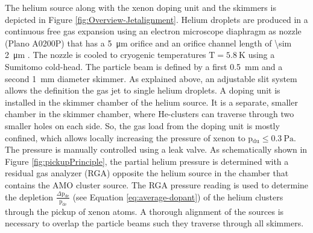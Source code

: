 The helium source along with the xenon doping unit and the skimmers is depicted in Figure \ref{fig:Overview-Jetalignment}. Helium droplets are produced in a continuous free gas expansion using an electron microscope diaphragm as nozzle (Plano A0200P) that has a \SI{5}{\micro\meter} orifice and an orifice channel length of \SI{\sim 2}{\micro\meter} \citep{Gomez-2011-JCP}. The nozzle is cooled to cryogenic temperatures $\text{T}= \SI{5.8}{\kelvin}$ using a Sumitomo cold-head. The particle beam is defined by a first \SI{0.5}{\milli\meter} and a second \SI{1}{\milli\meter} diameter skimmer. As explained above, an adjustable slit system allows the definition the gas jet to single helium droplets. A doping unit is installed in the skimmer chamber of the helium source. It is a separate, smaller chamber in the skimmer chamber, where He-clusters can traverse through two smaller holes on each side. So, the gas load from the doping unit is mostly confined, which allows locally increasing the pressure of xenon to p$_{\text{du}}\leq \SI{0.3}{\pascal}$. The pressure is manually controlled using a leak valve. As schematically shown in Figure \ref{fig:pickupPrinciple}, the partial helium pressure is determined with a residual gas analyzer (RGA) opposite the helium source in the chamber that contains the AMO cluster source. The RGA pressure reading is used to determine the depletion $\tfrac{\Delta \text{p}_{\text{de}}}{\text{p}_{\text{de}}}$ (see Equation \eqref{eq:average-dopant}) of the helium clusters through the pickup of xenon atoms. A thorough alignment of the sources is necessary to overlap the particle beams such they traverse through all skimmers.%
%
%
%

